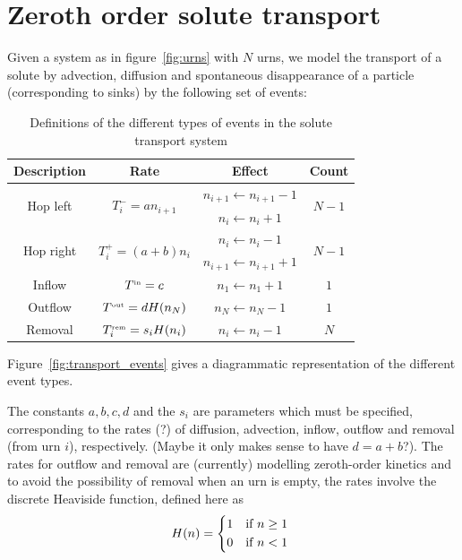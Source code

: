 \documentclass[a4paper,11pt]{report}
\numberwithin{equation}{section}
\newcommand{\Sst}[1]{^\text{\tiny #1}}
\begin{document}
\section{Zeroth order solute transport}
Given a system as in figure~\ref{fig:urns} with \(N\) urns, we model the
transport of a solute by advection, diffusion and spontaneous disappearance of a
particle (corresponding to sinks) by the following set of events:

\begin{table}[ht!]
    \centering
    \begin{tabular}{ c | c | c | c }
        Description & Rate & Effect & Count \\ \hline\hline
        \multirow{2}{*}{Hop left} & \multirow{2}{*}{\(T^-_i = a n_{i+1}\)} &
        \(n_{i+1} \leftarrow n_{i+1} - 1\) & \multirow{2}{*}{\(N-1\)} \\
        & & \(n_i \leftarrow n_i + 1\) \\ \hline
        \multirow{2}{*}{Hop right} & \multirow{2}{*}{\(T^+_i = (a+b) n_i\)} &
        \(n_i \leftarrow n_i - 1\) & \multirow{2}{*}{\(N-1\)} \\
        & & \(n_{i+1} \leftarrow n_{i+1} + 1\) \\ \hline
        Inflow & \(T\Sst{in} = c\) & \(n_1 \leftarrow n_1 + 1\) & \(1\) \\ \hline
        Outflow & \(T\Sst{out} = d H(n_N)\) & \(n_N \leftarrow n_N - 1\) & \(1\) \\ \hline
        Removal & \(T\Sst{rem}_i = s_i H(n_i)\) & \(n_i \leftarrow n_i - 1\) & \(N\) \\
    \end{tabular}
    \caption{\label{tab:transport_events}Definitions of the different types of
events in the solute transport system}
\end{table}
Figure~\ref{fig:transport_events} gives a diagrammatic representation of the
different event types.

The constants \(a,b,c,d\) and the \(s_i\) are parameters which must be
specified, corresponding to the rates (?) of diffusion, advection, inflow,
outflow and removal (from urn \(i\)), respectively. (Maybe it only makes sense to have
\(d=a+b\)?). The rates for outflow and removal are (currently) modelling
zeroth-order kinetics and to avoid the possibility of removal when an urn is
empty, the rates involve the discrete Heaviside function, defined
here as
\begin{equation*}
    H(n) =
    \begin{dcases*}
        1 & if \(n \ge 1\)\\
        0 & if \(n < 1\)
    \end{dcases*}
\end{equation*}
\end{document}
